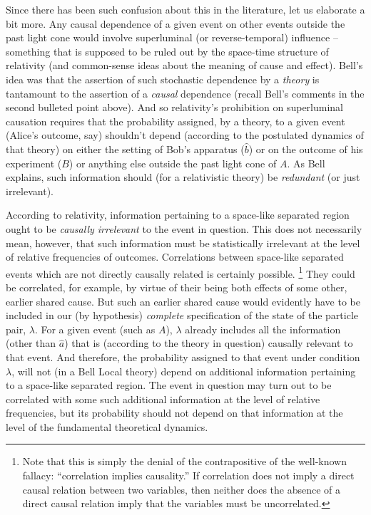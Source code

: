 \documentclass[aps,prc,onecolumn,12pt,nofootinbib]{revtex4-2}
\begin{document}
Since there has been such confusion about this in the literature, let
us elaborate a bit more.  Any causal dependence of a given event
on other events outside the past light cone would involve superluminal
(or reverse-temporal) influence -- something that is supposed to be
ruled out by the space-time structure of relativity (and common-sense
ideas about the meaning of cause and effect).  Bell's idea was
that the assertion of such stochastic dependence by a \emph{theory}
is tantamount to the assertion of a \emph{causal} dependence (recall
Bell's comments in the second bulleted point above).
And so relativity's prohibition on superluminal causation
requires that the probability assigned, by a theory,
to a given event (Alice's
outcome, say) shouldn't depend (according to the postulated dynamics
of that theory)
on either the setting of Bob's apparatus ($\hat{b}$)
or on the outcome of his experiment ($B$) or anything else outside the
past light cone of $A$.  As Bell explains, such
information should (for a relativistic theory) be \emph{redundant} (or
just irrelevant).

According to relativity, information pertaining to a
space-like separated region ought to be
\emph{causally irrelevant} to the event in question.  This does not
necessarily mean, however, that such information must be statistically
irrelevant at the level of relative frequencies of outcomes.
Correlations between space-like separated events which are not directly
causally related is certainly possible.%
\footnote{Note that this is
simply the denial of the contrapositive of the well-known fallacy:
``correlation implies causality.''  If correlation does not imply a
direct causal relation between two variables, then neither does the
absence of a direct causal relation imply that the variables must be
uncorrelated.}
They could be
correlated, for example, by virtue of their being both effects of some
other, earlier shared cause.  But such an earlier shared cause would
evidently have to be included in our (by hypothesis)
\emph{complete} specification of
the state of the particle pair, $\lambda$.  For a given event (such
as $A$),
$\lambda$ already includes all the information (other than $\hat{a}$)
that is (according to the theory in question) causally
relevant to that event.  And therefore, the probability assigned to
that event under condition $\lambda$, will not (in a Bell Local theory)
depend on additional information pertaining to a space-like
separated region.  The event in question may turn out to be
correlated with some such additional information at the level of
relative frequencies, but its probability should not depend on that
information at the level of the fundamental theoretical dynamics.
\end{document}
